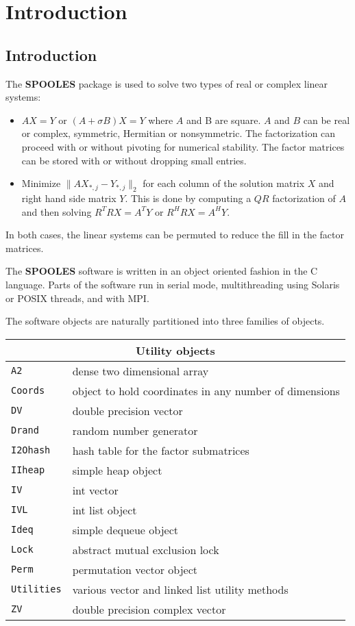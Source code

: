 \part{Introduction}
\chapter{Introduction}
\par
The {\bf SPOOLES} package is used to solve two types of 
real or complex linear systems:
\begin{itemize}
\item
$AX = Y$ or $(A + \sigma B)X = Y$ where $A$ and B are square.
$A$ and $B$ can be real or complex,
symmetric, Hermitian or nonsymmetric.
The factorization can proceed with or without pivoting for
numerical stability.
The factor matrices can be stored with or without dropping small
entries.
\item
Minimize $\|AX_{*,j} - Y_{*,j}\|_2$ for each column of the solution
matrix $X$ and right hand side matrix $Y$.
This is done by computing a $QR$ factorization of $A$ and then
solving $R^T R X = A^T Y$ or $R^H R X = A^H Y$.
\end{itemize}
In both cases, the linear systems can be permuted to reduce the
fill in the factor matrices.
\par
The {\bf SPOOLES} software is written in an object oriented fashion
in the C language.
Parts of the software run in serial mode, 
multithreading using Solaris or POSIX threads, and with MPI.
\par
The software objects are naturally partitioned into three families of
objects.
\par
\begin{center}
\begin{tabular}{|l|l|} 
\multicolumn{2}{c}{\bf Utility objects} \\ \hline
{\tt A2} & dense two dimensional array \\
{\tt Coords} & object to hold coordinates in any number of dimensions \\
{\tt DV} & double precision vector \\
{\tt Drand} & random number generator \\
{\tt I2Ohash} & hash table for the factor submatrices \\
{\tt IIheap} & simple heap object \\
{\tt IV} & int vector \\
{\tt IVL} & int list object \\
{\tt Ideq} & simple dequeue object \\
{\tt Lock} & abstract mutual exclusion lock \\
{\tt Perm} & permutation vector object \\
{\tt Utilities} & various vector and linked list utility methods \\
{\tt ZV} & double precision complex vector \\
\hline
\end{tabular}
\end{center}
